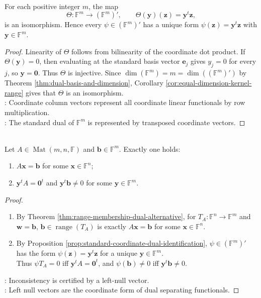 \begin{proposition} \label{prop:standard-coordinate-dual-identification} \\
For each positive integer $m$, the map
\[
\Theta:\mathbb{F}^m\to(\mathbb{F}^m)',\qquad
\Theta(\mathbf{y})(\mathbf{z})=\mathbf{y}^t\mathbf{z},
\]
is an isomorphism. Hence every $\psi\in(\mathbb{F}^m)'$ has a unique form $\psi(\mathbf{z})=\mathbf{y}^t\mathbf{z}$ with $\mathbf{y}\in\mathbb{F}^m$.
\begin{proof}
Linearity of $\Theta$ follows from bilinearity of the coordinate dot product. If $\Theta(\mathbf{y})=0$, then evaluating at the standard basis vector $\mathbf{e}_j$ gives $y_j=0$ for every $j$, so $\mathbf{y}=\mathbf{0}$. Thus $\Theta$ is injective. Since $\dim(\mathbb{F}^m)=m=\dim((\mathbb{F}^m)')$ by Theorem \ref{thm:dual-basis-and-dimension}, Corollary \ref{cor:equal-dimension-kernel-range} gives that $\Theta$ is an isomorphism.\\
: Coordinate column vectors represent all coordinate linear functionals by row multiplication.\\
: The standard dual of $\mathbb{F}^m$ is represented by transposed coordinate vectors.
\end{proof}
\end{proposition}

\begin{corollary} \label{cor:matrix-equation-left-nullspace-alternative} \\
Let $A\in\operatorname{Mat}(m,n,\mathbb{F})$ and $\mathbf{b}\in\mathbb{F}^m$. Exactly one holds:
\begin{enumerate}[label=(\roman*)]
\setlength{\itemsep}{0pt}
\item $A\mathbf{x}=\mathbf{b}$ for some $\mathbf{x}\in\mathbb{F}^n$;
\item $\mathbf{y}^tA=\mathbf{0}^t$ and $\mathbf{y}^t\mathbf{b}\neq0$ for some $\mathbf{y}\in\mathbb{F}^m$.
\end{enumerate}
\begin{proof}
\begin{enumerate}[label=(\roman*)]
\setlength{\itemsep}{0pt}
\item By Theorem \ref{thm:range-membership-dual-alternative}, for $T_A:\mathbb{F}^n\to\mathbb{F}^m$ and $\mathbf{w}=\mathbf{b}$, $\mathbf{b}\in\operatorname{range}(T_A)$ is exactly $A\mathbf{x}=\mathbf{b}$ for some $\mathbf{x}\in\mathbb{F}^n$.
\item By Proposition \ref{prop:standard-coordinate-dual-identification}, $\psi\in(\mathbb{F}^m)'$ has the form $\psi(\mathbf{z})=\mathbf{y}^t\mathbf{z}$ for a unique $\mathbf{y}\in\mathbb{F}^m$.\\
Thus $\psi T_A=0$ iff $\mathbf{y}^tA=\mathbf{0}^t$, and $\psi(\mathbf{b})\neq0$ iff $\mathbf{y}^t\mathbf{b}\neq0$.
\end{enumerate}
: Inconsistency is certified by a left-null vector.\\
: Left null vectors are the coordinate form of dual separating functionals.
\end{proof}
\end{corollary}

